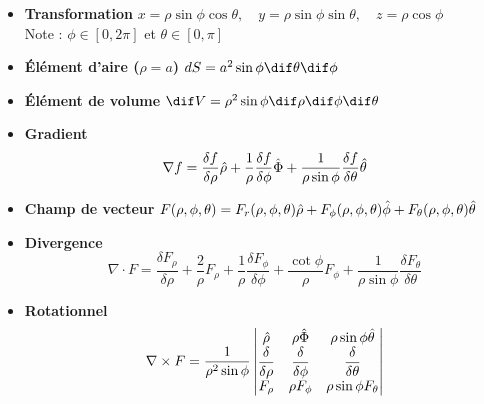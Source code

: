\begin{itemize}
  \item{\textbf{Transformation}}
    $
    x = \rho \sin{\phi}\cos{\theta} ,\quad  y = \rho \sin{\phi} \sin{\theta} ,\quad z = \rho \cos{\phi}
    $\\
    Note : $\phi \in [0,2\pi]$ et $\theta \in [0,\pi]$
  \item{\textbf{Élément d'aire ($\rho = a$)}}
    $
    dS = a^2 \sin{\phi} \dif\theta \dif\phi
    $
  \item{\textbf{Élément de volume}}
    $
    \dif V = \rho^2 \sin{\phi} \dif\rho \dif\phi \dif\theta$
  \item{\textbf{Gradient}}
    $$
    \nabla f = \frac{\delta f}{\delta \rho} \Hat{\rho} + \frac{1 }{\rho} \frac{\delta f}{\delta \phi} \Hat{\Phi} + \frac{1}{\rho \sin{\phi}} \frac{\delta f}{\delta \theta} \Hat{\theta}
    $$
  \item{\textbf{Champ de vecteur}}
    $
    F(\rho, \phi,\theta) = F_r(\rho, \phi,\theta) \Hat{\rho} + F_\phi(\rho, \phi, \theta)\Hat{\phi} + F_\theta (\rho, \phi,\theta) \Hat{\theta}$
  \item{\textbf{Divergence}}
    $$
    \nabla \cdot F = \dfrac{\delta F_\rho}{\delta \rho} +  \dfrac{2}{\rho}F_\rho +  \dfrac{1}{\rho}  \dfrac{\delta F_\phi}{\delta \phi} +  \dfrac{\cot{\phi}}{\rho} F_\phi +  \dfrac{1}{\rho \sin{\phi}}  \dfrac{\delta F_\theta }{\delta \theta }$$
  \item{\textbf{Rotationnel}}
    $$
    \nabla \times F=\frac { 1 }{ \rho^2 \sin{\phi} }
    \begin{vmatrix}
      \Hat{\rho} & \rho\Hat{\Phi} & \rho \sin{\phi}\Hat{\theta} \\
      \dfrac{\delta }{\delta \rho} & \dfrac{\delta }{\delta \phi} & \dfrac{\delta }{\delta \theta} \\
      F_\rho & \rho F_\phi & \rho \sin{\phi} F_\theta
    \end{vmatrix}
    $$
\end{itemize}


